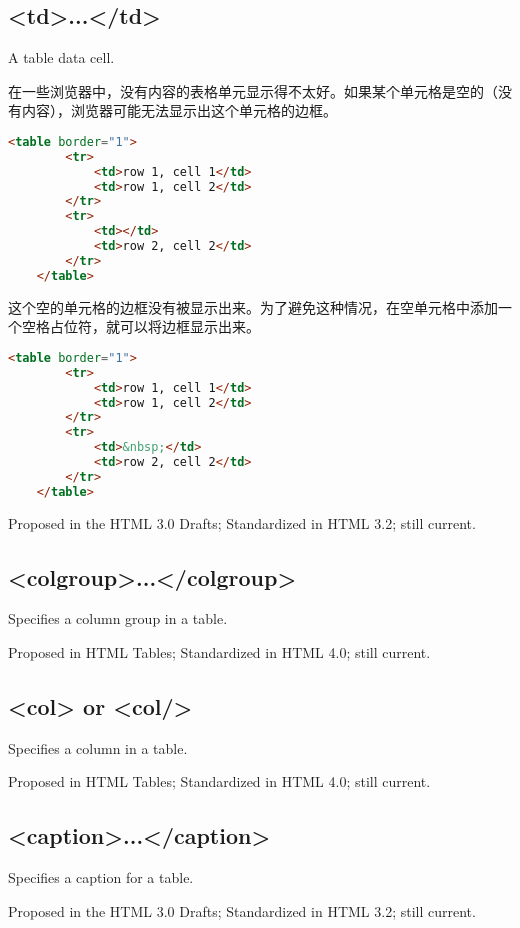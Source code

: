 \subsection{<td>...</td>}

A table data cell.

在一些浏览器中，没有内容的表格单元显示得不太好。如果某个单元格是空的（没有内容），浏览器可能无法显示出这个单元格的边框。

\begin{lstlisting}[language=HTML]
	<table border="1">
		<tr>
			<td>row 1, cell 1</td>
			<td>row 1, cell 2</td>
		</tr>
		<tr>
			<td></td>
			<td>row 2, cell 2</td>
		</tr>
	</table>
\end{lstlisting}

这个空的单元格的边框没有被显示出来。为了避免这种情况，在空单元格中添加一个空格占位符，就可以将边框显示出来。

\begin{lstlisting}[language=HTML]
	<table border="1">
		<tr>
			<td>row 1, cell 1</td>
			<td>row 1, cell 2</td>
		</tr>
		<tr>
			<td>&nbsp;</td>
			<td>row 2, cell 2</td>
		</tr>
	</table>
\end{lstlisting}


Proposed in the HTML 3.0 Drafts; Standardized in HTML 3.2; still current.

\subsection{<colgroup>...</colgroup>}

Specifies a column group in a table.

Proposed in HTML Tables; Standardized in HTML 4.0; still current.

\subsection{<col> or <col/>}

Specifies a column in a table.

Proposed in HTML Tables; Standardized in HTML 4.0; still current.


\subsection{<caption>...</caption>}


Specifies a caption for a table.

Proposed in the HTML 3.0 Drafts; Standardized in HTML 3.2; still current.


